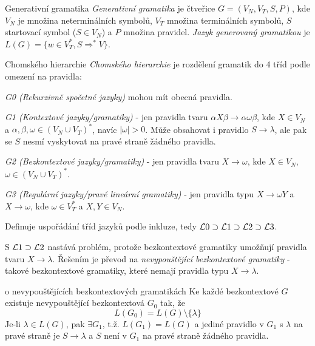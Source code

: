 \begin{definiceN}{Generativní gramatika}
\emph{Generativní gramatika} je čtveřice $G=(V_N,V_T,S,P)$, kde $V_N$ je množina neterminálních symbolů, $V_T$ množina terminálních symbolů, $S$ startovací symbol ($S\in V_N$) a $P$ množina pravidel. \emph{Jazyk generovaný gramatikou} je $L(G)=\{w\in V_T^{\ast}, S\Rightarrow^{\ast}V\}$.
\end{definiceN}

\begin{definiceN}{Chomského hierarchie}
\emph{Chomského hierarchie} je rozdělení gramatik do 4 tříd podle omezení na pravidla:
\begin{pitemize}
    \item \emph{G0 (Rekurzivně spočetné jazyky)} mohou mít obecná pravidla.
    \item \emph{G1 (Kontextové jazyky/gramatiky)} - jen pravidla tvaru
	$\alpha X\beta \to \alpha\omega\beta$, kde $X\in V_N$ a $\alpha,\beta,\omega \in (V_N\cup V_T)^{\ast}$, navíc $|\omega|>0$. Může obsahovat i pravidlo $S\to\lambda$, ale pak se $S$ nesmí vyskytovat na pravé straně žádného pravidla.
    \item \emph{G2 (Bezkontextové jazyky/gramatiky)} - jen pravidla tvaru 
	$X \to \omega$, kde $X\in V_N$, $\omega\in(V_N\cup V_T)^{\ast}$.
    \item \emph{G3 (Regulární jazyky/pravé lineární gramatiky)} - jen pravidla typu
	$X\to\omega Y$ a $X\to\omega$, kde $\omega\in V_T^{\ast}$ a $X,Y\in V_N$. 
\end{pitemize}
Definuje uspořádání tříd jazyků podle inkluze, tedy $\mathcal{L}0 \supset \mathcal{L}1 \supset \mathcal{L}2 \supset \mathcal{L}3$.
\end{definiceN}

\begin{poznamka}
S $\mathcal{L}1 \supset \mathcal{L}2$ nastává problém, protože bezkontextové gramatiky umožňují pravidla tvaru $X\to\lambda$. Řešením je převod na \emph{nevypouštějící bezkontextové gramatiky} - takové bezkontextové gramatiky, které nemají pravidla typu $X\to\lambda$.
\end{poznamka}

\begin{vetaN}{o nevypouštějících bezkontextových gramatikách}
Ke každé bezkontextové $G$ existuje nevypouštějící bezkontextová $G_0$ tak, že $$L(G_0)=L(G)\setminus\{\lambda\}$$ Je-li $\lambda\in L(G)$, pak $\exists G_1$, t.ž. $L(G_1)=L(G)$ a jediné pravidlo v $G_1$ s $\lambda$ na pravé straně je $S\to\lambda$ a $S$ není v $G_1$ na pravé straně žádného pravidla.
\end{vetaN}

